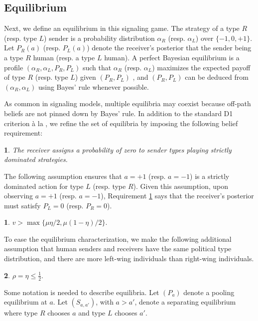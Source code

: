 \documentclass[english,12pt]{article}
\theoremstyle{plain}
\theoremstyle{plain}
\theoremstyle{definition}
\theoremstyle{definition}
\theoremstyle{assumption}
\newtheorem{assumption}{\protect\assumptionname}
\theoremstyle{plain}
\theoremstyle{plain}
\theoremstyle{plain}
\theoremstyle{plain}
\theoremstyle{definition}%
\theoremstyle{plain}
\theoremstyle{plain}
\theoremstyle{plain}
\theoremstyle{plain}
\theoremstyle{plain}
\theoremstyle{plain}
\newtheorem{requirement}{\protect\requirementname}
\providecommand{\assumptionname}{Assumption}
\providecommand{\requirementname}{Requirement}
\begin{document}
\subsection{Equilibrium}

Next, we define an equilibrium in this signaling game. The strategy of a type $R$ (resp. type $L$) sender is a probability distribution $\alpha_R$ (resp. $\alpha_L$) over $\{-1,0,+1\}$. Let $P_R(a)$ (resp. $P_L(a)$) denote the receiver's posterior that the sender being a type $R$ human (resp. a type $L$ human). A perfect Bayesian equilibrium is a profile $(\alpha_R,\alpha_L, P_R, P_L)$ such that $\alpha_R$ (resp. $\alpha_L$) maximizes the expected payoff of type $R$ (resp. type $L$) given $(P_R,P_L)$ , and $(P_R,P_L)$ can be deduced from $(\alpha_R,\alpha_L)$ using Bayes' rule whenever possible.

As common in signaling models, multiple equilibria may coexist because off-path beliefs are not pinned down by Bayes' rule. In addition to the standard D1 criterion \`{a} la \cite{ChoKreps:87}, we refine the set of equilibria by imposing the following belief requirement:

\begin{requirement}\label{requirement1}
    The receiver assigns a probability of zero to sender types playing strictly dominated strategies.
\end{requirement}


The following assumption ensures that $a=+1$ (resp. $a=-1$) is a strictly dominated action for type $L$ (resp. type $R$). Given this assumption, upon observing $a=+1$ (resp. $a=-1$), Requirement \ref{requirement1} says that the receiver's posterior must satisfy $P_L=0$ (resp. $P_R=0$).


\begin{assumption}\label{assumption:dominated}
    $v>\max\{\mu\eta/2,\mu(1-\eta)/2\}$.
\end{assumption}

To ease the equilibrium characterization, we make the following additional assumption that human senders and receivers have the same political type distribution, and there are more left-wing individuals than right-wing individuals.

\begin{assumption}\label{assumption:leftworld}
    $\rho=\eta\leq \frac{1}{2}$.
\end{assumption}

Some notation is needed to describe equilibria. Let $(P_a)$ denote a pooling equilibrium at $a$. Let $(S_{a,a'})$, with $a>a'$, denote a separating equilibrium where type $R$ chooses $a$ and type $L$ chooses $a'$.
\end{document}
